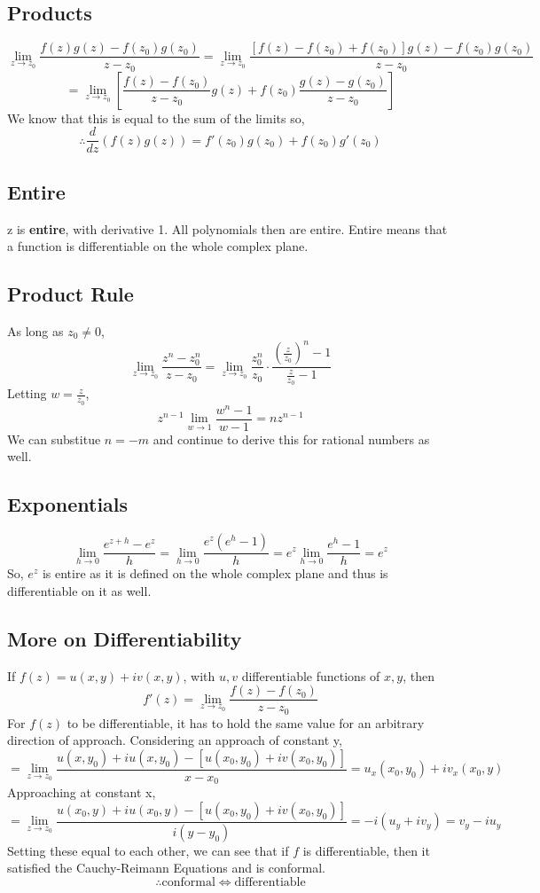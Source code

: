 \documentclass[../main.tex]{subfiles}
\begin{document}
    \subsection{Products}
        $$\lim_{z\rightarrow z_{0}}\frac{f(z)g(z)-f(z_{0})g(z_{0})}{z-z_{0}}=\lim_{z\rightarrow z_{0}}\frac{\left[f(z)-f(z_{0})+f(z_{0})\right]g(z)-f(z_{0})g(z_{0})}{z-z_{0}}$$
        $$=\lim_{z\rightarrow z_{0}}\left[\frac{f(z)-f(z_{0})}{z-z_{0}}g(z)+f(z_{0})\frac{g(z)-g(z_{0})}{z-z_{0}}\right]$$
        We know that this is equal to the sum of the limits so,
        $$\boxed{\therefore \frac{d}{dz}(f(z)g(z))=f'(z_{0})g(z_{0})+f(z_{0})g'(z_{0})}$$

    \subsection{Entire}
        z is \textbf{entire}, with derivative 1. All polynomials then are entire.
        Entire means that a function is differentiable on the whole complex plane.

    \subsection{Product Rule}
        As long as $z_{0}\neq 0$,
        $$\lim_{z\rightarrow z_{0}}\frac{z^{n}-z_{0}^{n}}{z-z_{0}}=\lim_{z\rightarrow z_{0}}\frac{z_{0}^{n}}{z_{0}}\cdot\frac{(\frac{z}{z_{0}})^{n}-1}{\frac{z}{z_{0}}-1}$$
        Letting $w=\frac{z}{z_{0}}$,
        $$z^{n-1}\lim_{w\rightarrow 1}\frac{w^{n}-1}{w-1}=nz^{n-1}$$
        We can substitue $n=-m$ and continue to derive this for rational numbers as well.

    \subsection{Exponentials}
        $$\lim_{h\rightarrow 0}\frac{e^{z+h}-e^{z}}{h}=\lim_{h\rightarrow 0}\frac{e^{z}(e^{h}-1)}{h}=e^{z}\lim_{h\rightarrow 0}\frac{e^{h}-1}{h}=e^{z}$$
        So, $e^{z}$ is entire as it is defined on the whole complex plane and thus is differentiable on it as well.

    \subsection{More on Differentiability}
        If $f(z)=u(x,y)+iv(x,y)$, with $u,v$ differentiable functions of $x,y$, then
        $$f'(z)=\lim_{z\rightarrow z_{0}}\frac{f(z)-f(z_{0})}{z-z_{0}}$$
        For $f(z)$ to be differentiable, it has to hold the same value for an arbitrary direction of approach. Considering an approach of constant y,
        $$=\lim_{z\rightarrow z_{0}}\frac{u(x,y_{0})+iu(x,y_{0})-[u(x_{0},y_{0})+iv(x_{0},y_{0})]}{x-x_{0}}=u_{x}(x_{0},y_{0})+iv_{x}(x_{0},y)$$
        Approaching at constant x,
        $$=\lim_{z\rightarrow z_{0}}\frac{u(x_{0},y)+iu(x_{0},y)-[u(x_{0},y_{0})+iv(x_{0},y_{0})]}{i(y-y_{0})}=-i(u_{y}+iv_{y})=v_{y}-iu_{y}$$
        Setting these equal to each other, we can see that if $f$ is differentiable, then it satisfied the Cauchy-Reimann Equations and is conformal.
        $$\boxed{\therefore \text{conformal}\Leftrightarrow \text{differentiable}}$$
\end{document}
